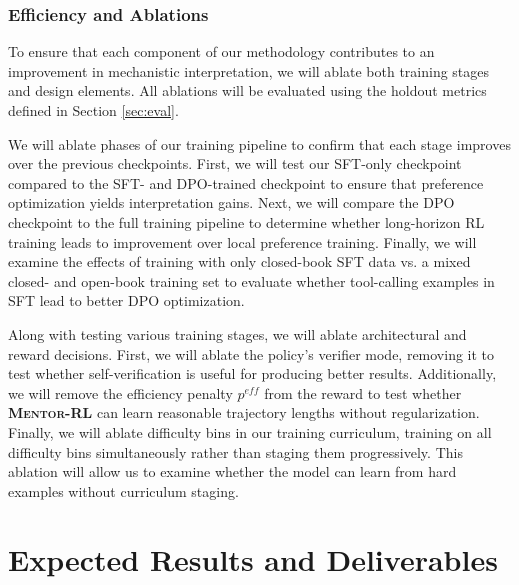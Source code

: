 \documentclass[thesis,letterpaper,12pt]{utthesis}
\begin{document}
\subsubsection{Efficiency and Ablations}
To ensure that each component of our methodology contributes to an improvement in mechanistic interpretation, we will ablate both training stages and design elements. All ablations will be evaluated using the holdout metrics defined in Section \ref{sec:eval}.

We will ablate phases of our training pipeline to confirm that each stage improves over the previous checkpoints. First, we will test our SFT-only checkpoint compared to the SFT- and DPO-trained checkpoint to ensure that preference optimization yields interpretation gains. Next, we will compare the DPO checkpoint to the full training pipeline to determine whether long-horizon RL training leads to improvement over local preference training. Finally, we will examine the effects of training with only closed-book SFT data vs. a mixed closed- and open-book training set to evaluate whether tool-calling examples in SFT lead to better DPO optimization.

Along with testing various training stages, we will ablate architectural and reward decisions. First, we will ablate the policy's verifier mode, removing it to test whether self-verification is useful for producing better results. Additionally, we will remove the efficiency penalty $p^{eff}$ from the reward to test whether \textbf{\textsc{Mentor-RL}} can learn reasonable trajectory lengths without regularization. Finally, we will ablate difficulty bins in our training curriculum, training on all difficulty bins simultaneously rather than staging them progressively. This ablation will allow us to examine whether the model can learn from hard examples without curriculum staging.

\section{Expected Results and Deliverables}
\end{document}
